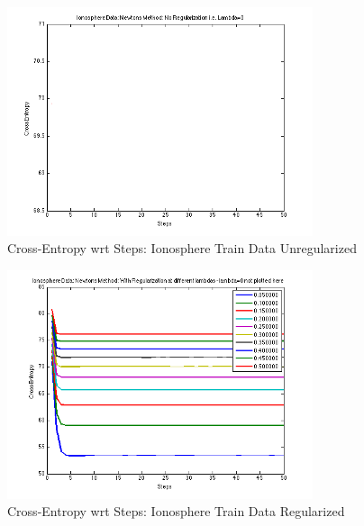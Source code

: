 \documentclass[paper=a4, fontsize=11pt]{scrartcl} %
\numberwithin{equation}{section} %
\numberwithin{figure}{section} %
\numberwithin{table}{section} %
\begin{document}
\begin{figure}[h!]
  \caption{Cross-Entropy wrt Steps: Ionosphere Train Data Unregularized}
  \centering
    \includegraphics[width=0.8\textwidth]{../Pics/newton/iono_unreg.png}
\end{figure}



\begin{figure}[h!]
  \caption{Cross-Entropy wrt Steps: Ionosphere Train Data Regularized}
  \centering
    \includegraphics[width=0.8\textwidth]{../Pics/newton/iono_reg_full.png}
\end{figure}
\end{document}
